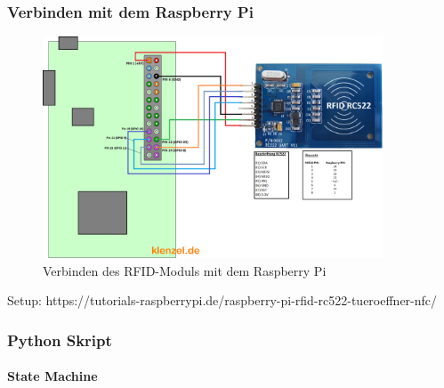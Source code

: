 \subsubsection{Verbinden mit dem Raspberry Pi}

\begin{figure}[H]
	\centering
	\includegraphics[width=0.9\textwidth]{Bilder/RFID.png}
	\caption{Verbinden des RFID-Moduls mit dem Raspberry Pi }
	\label{fig:RFID}
\end{figure}

Setup: https://tutorials-raspberrypi.de/raspberry-pi-rfid-rc522-tueroeffner-nfc/

\subsubsection{Python Skript}

\paragraph{State Machine}



